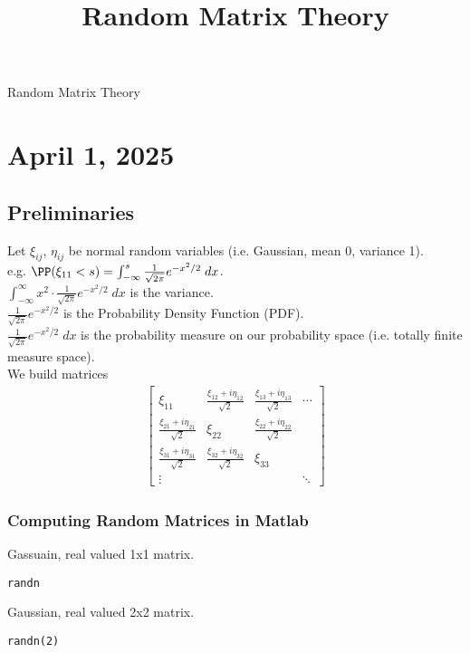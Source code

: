 \documentclass[11pt]{article}
\date{}
\title{Random Matrix Theory}
\begin{document}
{\centering
{\LARGE Random Matrix Theory \par }}
\section*{April 1, 2025}
\label{sec:org5aa28a6}
\subsection*{Preliminaries}
\label{sec:org7725c57}
Let \(\xi_{ij}\), \(\eta_{ij}\) be normal random variables (i.e. Gaussian, mean 0, variance 1).\\
e.g. \(\PP(\xi_{11}<s)=\int_{-\infty}^{s}\frac{1}{\sqrt{2\pi}}e^{-x^{2}/2}\;dx\).\\
\(\int_{-\infty}^{\infty}x^{2}\cdot\frac{1}{\sqrt{2\pi}}e^{-x^{2}/2}\;dx\) is the variance.\\
\(\frac{1}{\sqrt{2\pi}}e^{-x^{2}/2}\) is the Probability Density Function (PDF).\\
\(\frac{1}{\sqrt{2\pi}}e^{-x^{2}/2}\;dx\) is the probability measure on our probability space (i.e. totally finite measure space).\\
We build matrices\\
\begin{align*}
  \begin{bmatrix}
    \xi_{11} & \frac{\xi_{12}+i\eta_{12}}{\sqrt{2}} & \frac{\xi_{13}+i\eta_{13}}{\sqrt{2}} & \cdots \\
    \frac{\xi_{21}+i\eta_{21}}{\sqrt{2}} & \xi_{22} & \frac{\xi_{22}+i\eta_{22}}{\sqrt{2}} \\
    \frac{\xi_{31}+i\eta_{31}}{\sqrt{2}} & \frac{\xi_{32}+i\eta_{32}}{\sqrt{2}} &  \xi_{33} \\
    \vdots & & & \ddots
  \end{bmatrix}
\end{align*}
\subsubsection*{Computing Random Matrices in Matlab}
\label{sec:orga0096eb}
Gassuain, real valued 1x1 matrix.\\
\begin{verbatim}
randn
\end{verbatim}

Gaussian, real valued 2x2 matrix.\\
\begin{verbatim}
randn(2)
\end{verbatim}
\end{document}
